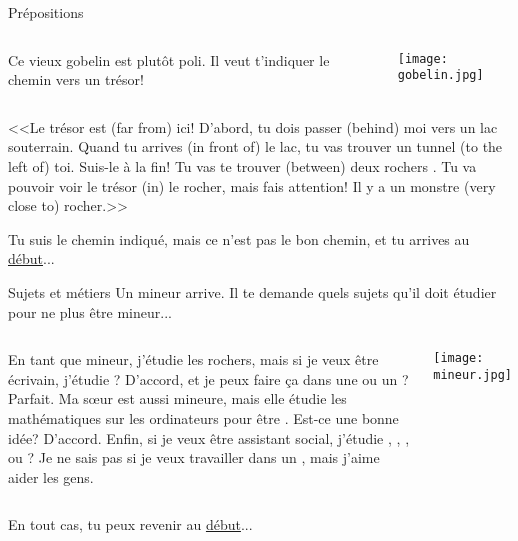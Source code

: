 \documentclass{beamer}
\begin{document}
  \begin{frame}{Prépositions}
    \hypertarget{prépositions}{}
    \begin{columns}
        Ce vieux gobelin est plutôt poli.
        Il veut t'indiquer le chemin vers un trésor!
        \begin{center}
          \texttt{[image: gobelin.jpg]}
        \end{center}
    \end{columns}

    \vspace{0.25cm}
    <<Le trésor est \underline{} (far from) ici!
    D'abord, tu dois passer \underline{} (behind) moi vers un lac souterrain.
    Quand tu arrives \underline{} (in front of) le lac, tu vas trouver un tunnel \underline{} (to the left of) toi.
    Suis-le à la fin!
    Tu vas te trouver \underline{} (between) deux rochers .
    Tu va pouvoir voir le trésor \underline{} (in) le rocher, mais fais attention!
    Il y a un monstre \underline{} (very close to) rocher.>>

    \vspace{0.25cm}
    Tu suis le chemin indiqué, mais ce n'est pas le bon chemin, et tu arrives au \hyperlink{début}{début}...
  \end{frame}

  \begin{frame}{Sujets et métiers}
    \hypertarget{sujets}{}
    Un mineur arrive.
    Il te demande quels sujets qu'il doit étudier pour ne plus être mineur...

    \vspace{0.25cm}
    \begin{columns}
        \small
        En tant que mineur, j'étudie les rochers, mais si je veux être écrivain, j'étudie \underline{}?
        D'accord, et je peux faire ça dans une \underline{} ou un \underline{}?
        Parfait.
        Ma sœur est aussi mineure, mais elle étudie les mathématiques sur les ordinateurs pour être \underline{}.
        Est-ce une bonne idée?
        D'accord.
        Enfin, si je veux être assistant social, j'étudie \underline{}, \underline{}, \underline{}, ou \underline{}?
        Je ne sais pas si je veux travailler dans un \underline{}, mais j'aime aider les gens.

        \begin{center}
          \texttt{[image: mineur.jpg]}
        \end{center}
    \end{columns}
    \vspace{0.25cm}
    En tout cas, tu peux revenir au \hyperlink{début}{début}...
  \end{frame}
\end{document}
